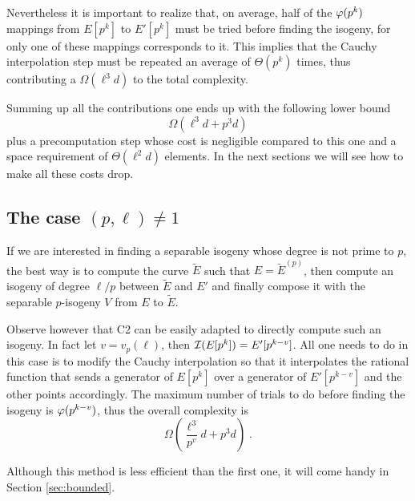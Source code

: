 Nevertheless it is important to realize that, on average, half of the
$\varphi(p^k)$ mappings from $E[p^k]$ to $E'[p^k]$ must be tried before
finding the isogeny, for only one of these mappings corresponds to
it. This implies that the Cauchy interpolation step must be repeated
an average of $\Theta(p^k)$ times, thus contributing a
$\Omega(\ell^3d)$ to the total complexity.

Summing up all the contributions one ends up with the following lower
bound
\begin{equation}
  \label{eq:C2:complexity}
  \Omega(\ell^3d + p^3d)
\end{equation}
plus a precomputation step whose cost is negligible compared to this
one and a space requirement of $\Theta(\ell^2d)$ elements. In the next
sections we will see how to make all these costs drop.


\subsection{The case $(p,\ell)\ne1$}
\label{sec:C2:non-prime}
If we are interested in finding a separable isogeny whose degree is
not prime to $p$, the best way is to compute the curve $\widetilde{E}$
such that $E = \widetilde{E}^{(p)}$, then compute an isogeny of degree
$\ell/p$ between $\widetilde{E}$ and $E'$ and finally compose it with
the separable $p$-isogeny $V$ from $E$ to $\widetilde{E}$.

Observe however that C2 can be easily adapted to directly compute such
an isogeny. In fact let $v=v_p(\ell)$, then $\mathcal{I}(E[p^k]) =
E'[p^{k-v}]$. All one needs to do in this case is to modify the Cauchy
interpolation so that it interpolates the rational function that sends
a generator of $E[p^k]$ over a generator of $E'[p^{k-v}]$ and the
other points accordingly. The maximum number of trials to do before
finding the isogeny is $\varphi(p^{k-v})$, thus the overall complexity
is
\begin{equation}
  \label{eq:C2:complexity-non-prime}
  \Omega\left(\frac{\ell^3}{p^v}d + p^3d\right)
  \;\text{.}
\end{equation}

Although this method is less efficient than the first one, it will
come handy in Section \ref{sec:bounded}.



%
